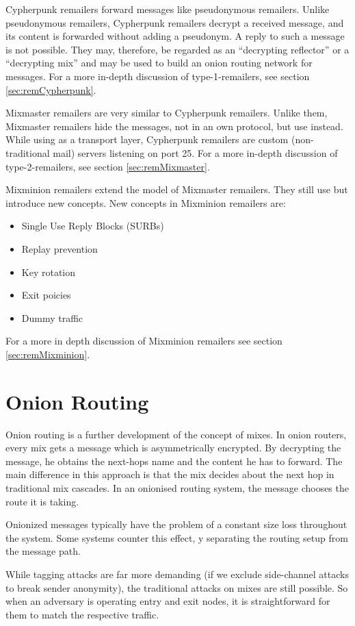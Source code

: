 Cypherpunk remailers forward messages like pseudonymous remailers. Unlike pseudonymous remailers, Cypherpunk remailers decrypt a received message, and its content is forwarded without adding a pseudonym. A reply to such a message is not possible. They may, therefore, be regarded as an ``decrypting reflector'' or a ``decrypting mix'' and may be used to build an onion routing network for messages. For a more in-depth discussion of type-1-remailers, see section  \ref{sec:remCypherpunk}.

Mixmaster remailers are very similar to Cypherpunk remailers. Unlike them, Mixmaster remailers hide the messages, not in an own protocol, but use  instead. While using  as a transport layer, Cypherpunk remailers are custom (non-traditional mail) servers listening on port 25. For a more in-depth discussion of type-2-remailers, see section \ref{sec:remMixmaster}.

Mixminion remailers extend the model of Mixmaster remailers. They still use  but introduce new concepts. New concepts in Mixminion remailers are:
\begin{itemize}
	\item Single Use Reply Blocks (SURBs)
	\item Replay prevention
	\item Key rotation
	\item Exit poicies
	\item Dummy traffic
\end{itemize}
For a more in depth discussion of Mixminion remailers see section \ref{sec:remMixminion}.


\section{Onion Routing}
Onion routing is a further development of the concept of mixes. In onion routers, every mix gets a message which is asymmetrically encrypted. By decrypting the message, he obtains the next-hops name and the content he has to forward. The main difference in this approach is that the mix decides about the next hop in traditional mix cascades. In an onionised routing system, the message chooses the route it is taking. 

Onionized messages typically have the problem of a constant size loss throughout the system. Some systems counter this effect, y separating the routing setup from the message path.

While tagging attacks are far more demanding (if we exclude side-channel attacks to break sender anonymity), the traditional attacks on mixes are still possible. So when an adversary is operating entry and exit nodes, it is straightforward for them to match the respective traffic.


